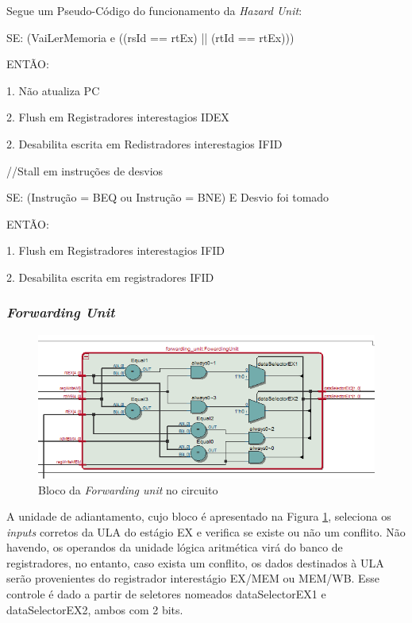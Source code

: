 \documentclass[
	11pt,				%
	openany,			%
	oneside,
	a4paper,			%
	chapter=TITLE,		%
	section=TITLE,		%
	english,			%
	brazil				%
	]{abntex2}
\begin{document}
Segue um Pseudo-Código do funcionamento da \textit{Hazard Unit}:

SE: (VaiLerMemoria e ((rsId == rtEx) || (rtId == rtEx)))
  
  ENTÃO:
    
    1. Não atualiza PC
   
   2. Flush em Registradores interestagios IDEX
    
    2. Desabilita escrita em Redistradores interestagios IFID

//Stall em instruções de desvios

SE: (Instrução = BEQ ou Instrução = BNE) E Desvio foi tomado
  
  ENTÃO:
    
    1. Flush em Registradores interestagios IFID
    
    2. Desabilita escrita em registradores IFID

\subsubsection{\textit{Forwarding Unit}}
\begin{figure}[H]
	\caption{\label{fig_blocoforwarding}Bloco da \textit{Forwarding unit} no circuito}
	\begin{center}
	    \includegraphics[scale=0.7]{forwardingunit.PNG}
	\end{center}
\end{figure}

A unidade de adiantamento, cujo bloco é apresentado na Figura \ref{fig_blocoforwarding}, seleciona os \textit{inputs} corretos da ULA do estágio EX e verifica se existe ou não um conflito. Não havendo, os operandos da unidade lógica aritmética virá do banco de registradores, no entanto, caso exista um conflito, os dados destinados à ULA serão provenientes do registrador interestágio EX/MEM ou MEM/WB. Esse controle é dado a partir de seletores nomeados dataSelectorEX1 e dataSelectorEX2, ambos com 2 bits.
\end{document}
